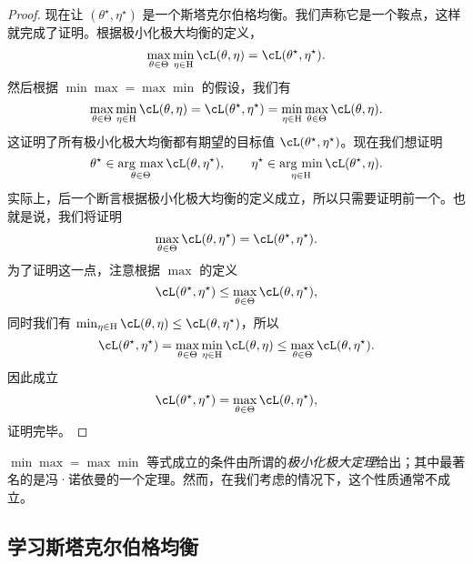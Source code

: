 \documentclass[../../book-main.tex]{subfiles}
\begin{document}
\begin{proof}
    现在让 \((\theta^{\star}, \eta^{\star})\) 是一个斯塔克尔伯格均衡。我们声称它是一个鞍点，这样就完成了证明。根据极小化极大均衡的定义，
    \begin{equation}
        \max_{\theta \in \Theta}\min_{\eta \in \Eta}\cL(\theta, \eta) = \cL(\theta^{\star}, \eta^{\star}).
    \end{equation}
    然后根据 \(\min\max = \max\min\) 的假设，我们有
    \begin{equation}
        \max_{\theta \in \Theta}\min_{\eta \in \Eta}\cL(\theta, \eta) = \cL(\theta^{\star}, \eta^{\star}) = \min_{\eta \in \Eta}\max_{\theta \in \Theta}\cL(\theta, \eta).
    \end{equation}
    这证明了所有极小化极大均衡都有期望的目标值 \(\cL(\theta^{\star}, \eta^{\star})\)。现在我们想证明
    \begin{equation}
        \theta^{\star} \in \argmax_{\theta \in \Theta}\cL(\theta, \eta^{\star}), \qquad \eta^{\star} \in \argmin_{\eta \in \Eta}\cL(\theta^{\star}, \eta).
    \end{equation}
    实际上，后一个断言根据极小化极大均衡的定义成立，所以只需要证明前一个。也就是说，我们将证明
    \begin{equation}
        \max_{\theta \in \Theta}\cL(\theta, \eta^{\star}) = \cL(\theta^{\star}, \eta^{\star}).
    \end{equation}
    为了证明这一点，注意根据 \(\max\) 的定义
    \begin{equation}
        \cL(\theta^{\star}, \eta^{\star}) \leq \max_{\theta \in \Theta}\cL(\theta, \eta^{\star}),
    \end{equation}
    同时我们有 \(\min_{\eta \in \Eta}\cL(\theta, \eta) \leq \cL(\theta, \eta^{\star})\)，所以
    \begin{equation}
        \cL(\theta^{\star}, \eta^{\star}) = \max_{\theta \in \Theta}\min_{\eta \in \Eta}\cL(\theta, \eta) \leq \max_{\theta \in \Theta}\cL(\theta, \eta^{\star}).
    \end{equation}
    因此成立
    \begin{equation}
        \cL(\theta^{\star}, \eta^{\star}) = \max_{\theta \in \Theta}\cL(\theta, \eta^{\star}),
    \end{equation}
    证明完毕。
\end{proof}
\(\min\max = \max\min\) 等式成立的条件由所谓的\textit{极小化极大定理}给出；其中最著名的是冯·诺依曼的一个定理。然而，在我们考虑的情况下，这个性质通常不成立。

\subsection{学习斯塔克尔伯格均衡}
\end{document}
